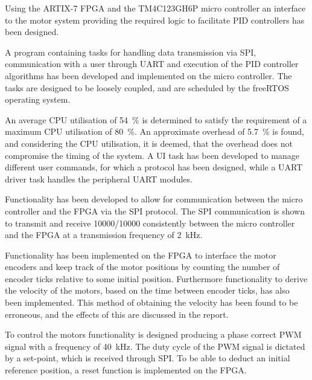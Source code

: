 \documentclass[../../main.tex]{subfiles}
\begin{document}

Using the ARTIX-7 FPGA and the TM4C123GH6P micro controller an interface to the motor system providing the required logic to facilitate PID controllers has been designed. 

A program containing tasks for handling data transmission via SPI, communication with a user through UART and execution of the PID controller algorithms has been developed and implemented on the micro controller. The tasks are designed to be loosely coupled, and are scheduled by the freeRTOS operating system.

An average CPU utilisation of \SI{54}{\percent} is determined to satisfy the requirement of a maximum CPU utilisation of \SI{80}{\percent}. An approximate overhead of \SI{5,7}{\percent} is found, and considering the CPU utilisation, it is deemed, that the overhead does not compromise the timing of the system. A UI task has been developed to manage different user commands, for which a protocol has been designed, while a UART driver task handles the peripheral UART modules.

Functionality has been developed to allow for communication between the micro controller and the FPGA via the SPI protocol. The SPI communication is shown to transmit and receive 10000/10000 consistently between the micro controller and the FPGA at a transmission frequency of \SI{2}{\kilo\hertz}. 

Functionality has been implemented on the FPGA to interface the motor encoders and keep track of the motor positions by counting the number of encoder ticks relative to some initial position. Furthermore functionality to derive the velocity of the motors, based on the time between encoder ticks, has also been implemented. This method of obtaining the velocity has been found to be erroneous, and the effects of this are discussed in the report. 

To control the motors functionality is designed producing a phase correct PWM signal with a frequency of \SI{40}{\kilo\hertz}. The duty cycle of the PWM signal is dictated by a set-point, which is received through SPI. To be able to deduct an initial reference position, a reset function is implemented on the FPGA.
\end{document}

